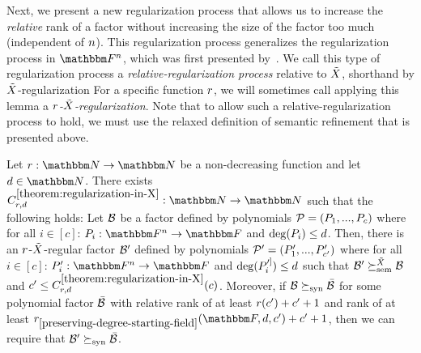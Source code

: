 Next, we present a new regularization process that allows us to increase the \emph{relative} rank of a factor without increasing the size of the factor too much (independent of $n$).
This regularization process generalizes the regularization process in $\field$, which was first presented by~\cite[2.3]{green2007distribution}.
We call this type of regularization process a \emph{relative-regularization process} relative to ${\tilde{X}}$, shorthand by ${\tilde{X}}$-regularization
For a specific function ${{{r}}}$, we will sometimes call applying this lemma a \emph{${{{r}}}$-${\tilde{X}}$-regularization}.
Note that to allow such a relative-regularization process to hold, we must use the relaxed definition of semantic refinement that is presented above.
\begin{theorem}\label{theorem:regularization-in-X}
    Let $\funcdef{\rankfunc}{\naturalnumbersset}{\naturalnumbersset}$ be a non-decreasing function and let $\degree \in \naturalnumbersset$.
    There exists $\funcdef{C_{\rankfunc, \degree}^{\ref{theorem:regularization-in-X}}}{\naturalnumbersset}{\naturalnumbersset}$ such that the following holds:
    Let $\mathcal{B}$ be a factor defined by polynomials $\genpolyset = (\genpoly_1,...,\genpoly_c)$ where for all $i \in [c]$: $\funcdef{\genpoly_i}{\field}{\basefield}$ and $\deg(\genpoly_i) \leq \degree$.
    Then, there is an ${{{r}}}$-${\tilde{X}}$-regular factor $\mathcal{B}^\prime$ defined by polynomials $\genpolyset^{\prime} = (\genpoly^{\prime}_{1},...,\genpoly^{\prime}_{c^\prime})$ where
    for all $i \in [c]$: $\funcdef{\genpoly^{\prime}_i}{\field}{\basefield}$ and $\deg(\genpoly^{\prime]}_{i}) \leq \degree$ such that
    $\mathcal{B}^\prime \succeq^{{\tilde{X}}}_{\text{sem}} \mathcal{B}$ and $c^\prime \leq C_{{{{r}}}, d}^{\ref{theorem:regularization-in-X}}(c)$.
    \newline
    Moreover, if $\mathcal{B} \succeq_{\text{syn}} \bar{\mathcal{B}}$ for some polynomial factor $\bar{\mathcal{B}}$ with
    relative rank of at least ${{{r}}}(c^\prime)+c^\prime+1$ and rank of at least ${\rankfunc_{\ref{preserving-degree-starting-field}}(\basefield, \degree, c^{\prime})} + c^\prime + 1$,
    then we can require that $\mathcal{B}^\prime \succeq_{\text{syn}} \bar{\mathcal{B}}$.
\end{theorem}
